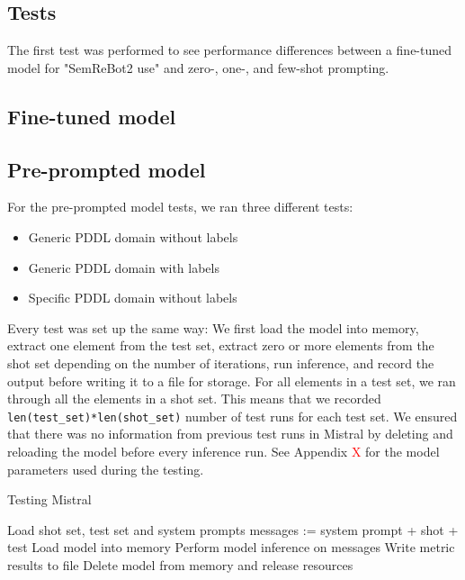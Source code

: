 \subsection{Tests}
The first test was performed to see performance differences between a fine-tuned model for "SemReBot2 use" and zero-, one-, and few-shot prompting.

\subsection{Fine-tuned model}

\subsection{Pre-prompted model}
For the pre-prompted model tests, we ran three different tests:

\begin{itemize}
    \item Generic PDDL domain without labels
    \item Generic PDDL domain with labels
    \item Specific PDDL domain without labels
\end{itemize}

Every test was set up the same way: We first load the model into memory, extract one element from the test set, extract zero or more elements from the shot set depending on the number of iterations, run inference, and record the output before writing it to a file for storage. For all elements in a test set, we ran through all the elements in a shot set. This means that we recorded \verb|len(test_set)*len(shot_set)| number of test runs for each test set. We ensured that there was no information from previous test runs in Mistral by deleting and reloading the model before every inference run. See Appendix \textcolor{red}{X} for the model parameters used during the testing.

\begin{algorithm}\label{alg:mistral_test}
    \caption{Testing Mistral}
    \begin{algorithmic}[1]
        \State Load shot set, test set and system prompts
                    \State messages := system prompt + shot + test
                    \State Load model into memory
                    \State Perform model inference on messages
                    \State Write metric results to file
                    \State Delete model from memory and release resources
                \EndFor
            \EndFor
        \EndFor
    \end{algorithmic}
\end{algorithm}

